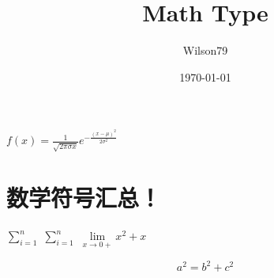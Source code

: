 \documentclass{article}
\title{Math Type}
\author{Wilson79}
\date{\today}
\begin{document}
 
    \tableofcontents %
    \maketitle %
    
    $f(x)=\frac{1}{\sqrt{2 \pi \sigma x}} e^{-\frac{(x-\mu)^{2}}{2 \sigma^{2}}}$

    \section{数学符号汇总！}
    
    $\sum _{i=1}^{n}$ %
    $\sum \limits_{i=1}^{n}$
    $\lim\limits _{x \rightarrow 0+} x^2 + x$ 


    {\color{blue} \[a^2 = b ^2 + c^2 \tag{*}\]} %
\end{document}
